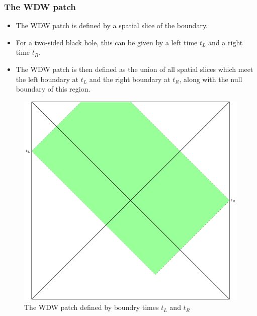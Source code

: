 \documentclass[8pt,aspectratio=169]{beamer}
\begin{document}
\begin{frame}
\frametitle{The WDW patch}

\begin{minipage}[t]{0.55\linewidth}

\begin{itemize}

\item The WDW patch is defined by a spatial slice of the boundary. 

\item For a two-sided black hole, this can be given by a left time $t_L$ and a right time $t_R$.

\item The WDW patch is then defined as the union of all spatial slices which meet the left boundary at $t_L$ and the right boundary at $t_R$, along with the null boundary of this region.

\end{itemize}

\end{minipage}\hfill
%
\begin{minipage}[t]{0.44\linewidth}

\begin{figure}
    \begin{center}
    
        \includegraphics[scale=0.4]{WDW.pdf}    
    
    \end{center}
    \caption{The WDW patch defined by boundry times $t_L$ and $t_R$}
    \label{fig:WDW}
\end{figure}

\end{minipage}

\end{frame}
\end{document}
